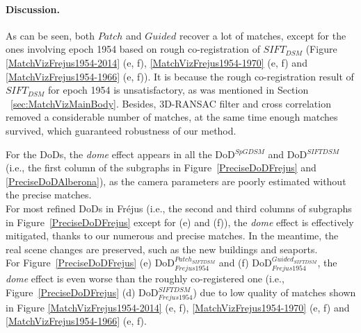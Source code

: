 \paragraph{Discussion.}
\label{para:DiscussionP}
As can be seen, both $Patch$ and $Guided$ recover a lot of matches, except for the ones involving epoch 1954 based on rough co-registration of $SIFT_{DSM}$ (Figure \ref{MatchVizFrejus1954-2014} (e, f), \ref{MatchVizFrejus1954-1970} (e, f) and \ref{MatchVizFrejus1954-1966} (e, f)). It is because the rough co-registration result of $SIFT_{DSM}$ for epoch 1954 is unsatisfactory, as was mentioned in Section ~\ref{sec:MatchVizMainBody}.
Besides, 3D-RANSAC filter and cross correlation removed a considerable number of matches, at the same time enough matches survived, which guaranteed robustness of our method.\\ %
\par
For the \ac{DoD}s, the \textit{dome} effect appears in all the DoD$^{SpGDSM}$ and DoD$^{SIFTDSM}$ (i.e., the first column of the subgraphs in Figure~\ref{PreciseDoDFrejus} and \ref{PreciseDoDAlberona}), as the camera parameters are poorly estimated without the precise matches.\\
For most refined \ac{DoD}s in Fr{\'e}jus (i.e., the second and third columns of subgraphs in Figure~\ref{PreciseDoDFrejus} except for (e) and (f)), the \textit{dome} effect is effectively mitigated, thanks to our numerous and precise matches. In the meantime, the real scene changes are preserved, such as the new buildings and seaports.\\
For Figure~\ref{PreciseDoDFrejus} (e) \ac{DoD}$_{Frejus1954}^{Patch_{SIFTDSM}}$ and (f) \ac{DoD}$_{Frejus1954}^{Guided_{SIFTDSM}}$, the \textit{dome} effect is even worse than the roughly co-registered one (i.e., Figure~\ref{PreciseDoDFrejus} (d) \ac{DoD}$_{Frejus1954}^{{SIFTDSM}}$) due to low quality of matches shown in Figure \ref{MatchVizFrejus1954-2014} (e, f), \ref{MatchVizFrejus1954-1970} (e, f) and \ref{MatchVizFrejus1954-1966} (e, f).\\
